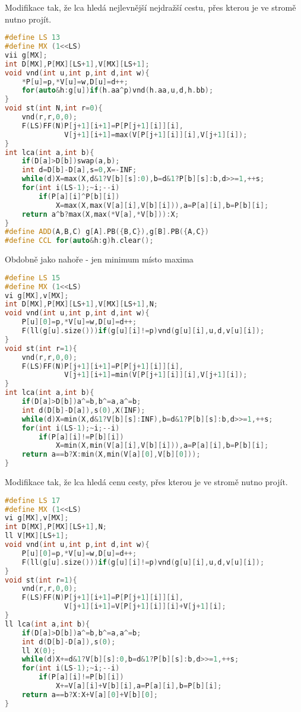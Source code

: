 \documentclass[11pt]{article}
\begin{document}
Modifikace tak, že lca hledá nejlevnější nejdražší cestu, přes kterou je ve stromě nutno projít.
\begin{lstlisting}[language=C++]
#define LS 13
#define MX (1<<LS)
vii g[MX];
int D[MX],P[MX][LS+1],V[MX][LS+1];
void vnd(int u,int p,int d,int w){
    *P[u]=p,*V[u]=w,D[u]=d++;
    for(auto&h:g[u])if(h.aa^p)vnd(h.aa,u,d,h.bb);
}
void st(int N,int r=0){
    vnd(r,r,0,0);
    F(LS)FF(N)P[j+1][i+1]=P[P[j+1][i]][i],
              V[j+1][i+1]=max(V[P[j+1][i]][i],V[j+1][i]);
}
int lca(int a,int b){
    if(D[a]>D[b])swap(a,b);
    int d=D[b]-D[a],s=0,X=-INF;
    while(d)X=max(X,d&1?V[b][s]:0),b=d&1?P[b][s]:b,d>>=1,++s;
    for(int i(LS-1);~i;--i)
        if(P[a][i]^P[b][i])
            X=max(X,max(V[a][i],V[b][i])),a=P[a][i],b=P[b][i];
    return a^b?max(X,max(*V[a],*V[b])):X;
}
#define ADD(A,B,C) g[A].PB({B,C}),g[B].PB({A,C})
#define CCL for(auto&h:g)h.clear();
\end{lstlisting}
Obdobně jako nahoře - jen minimum místo maxima
\begin{lstlisting}[language=C++]
#define LS 15
#define MX (1<<LS)
vi g[MX],v[MX];
int D[MX],P[MX][LS+1],V[MX][LS+1],N;
void vnd(int u,int p,int d,int w){
    P[u][0]=p,*V[u]=w,D[u]=d++;
    F(ll(g[u].size()))if(g[u][i]!=p)vnd(g[u][i],u,d,v[u][i]);
}
void st(int r=1){
    vnd(r,r,0,0);
    F(LS)FF(N)P[j+1][i+1]=P[P[j+1][i]][i],
              V[j+1][i+1]=min(V[P[j+1][i]][i],V[j+1][i]);
}
int lca(int a,int b){
    if(D[a]>D[b])a^=b,b^=a,a^=b;
    int d(D[b]-D[a]),s(0),X(INF);
    while(d)X=min(X,d&1?V[b][s]:INF),b=d&1?P[b][s]:b,d>>=1,++s;
    for(int i(LS-1);~i;--i)
        if(P[a][i]!=P[b][i])
            X=min(X,min(V[a][i],V[b][i])),a=P[a][i],b=P[b][i];
    return a==b?X:min(X,min(V[a][0],V[b][0]));
}
\end{lstlisting}
Modifikace tak, že lca hledá cenu cesty, přes kterou je ve stromě nutno projít.
\begin{lstlisting}[language=C++]
#define LS 17
#define MX (1<<LS)
vi g[MX],v[MX];
int D[MX],P[MX][LS+1],N;
ll V[MX][LS+1];
void vnd(int u,int p,int d,int w){
    P[u][0]=p,*V[u]=w,D[u]=d++;
    F(ll(g[u].size()))if(g[u][i]!=p)vnd(g[u][i],u,d,v[u][i]);
}
void st(int r=1){
    vnd(r,r,0,0);
    F(LS)FF(N)P[j+1][i+1]=P[P[j+1][i]][i],
              V[j+1][i+1]=V[P[j+1][i]][i]+V[j+1][i];
}
ll lca(int a,int b){
    if(D[a]>D[b])a^=b,b^=a,a^=b;
    int d(D[b]-D[a]),s(0);
    ll X(0);
    while(d)X+=d&1?V[b][s]:0,b=d&1?P[b][s]:b,d>>=1,++s;
    for(int i(LS-1);~i;--i)
        if(P[a][i]!=P[b][i])
            X+=V[a][i]+V[b][i],a=P[a][i],b=P[b][i];
    return a==b?X:X+V[a][0]+V[b][0];
}
\end{lstlisting}
\end{document}

